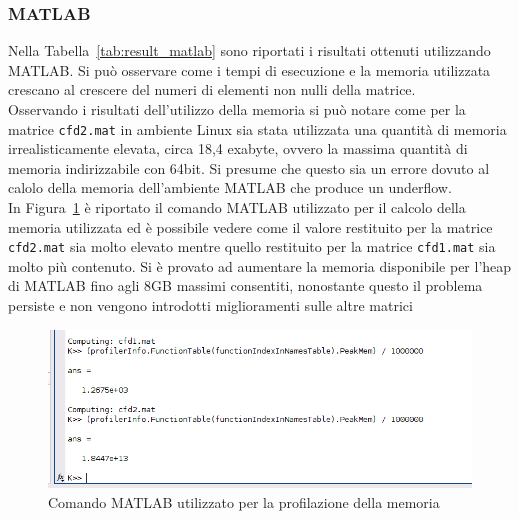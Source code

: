 \documentclass[a4paper, 12pt]{article}
\begin{document}
\subsubsection{MATLAB}
Nella Tabella~\ref{tab:result_matlab} sono riportati i risultati ottenuti
utilizzando MATLAB.
Si può osservare come i tempi di esecuzione e la memoria utilizzata crescano al
crescere del numeri di elementi non nulli della matrice.\\
Osservando i risultati dell'utilizzo della memoria si può notare come per la
matrice \texttt{cfd2.mat} in ambiente Linux sia stata utilizzata una quantità di
memoria irrealisticamente elevata, circa 18,4 exabyte, ovvero la massima
quantità di memoria indirizzabile con 64bit.
Si presume che questo sia un errore dovuto al calolo della memoria dell'ambiente
MATLAB che produce un underflow.\\
In Figura~\ref{fig:matlab_overflow} è riportato il comando MATLAB utilizzato
per il calcolo della memoria utilizzata ed è possibile vedere come il valore
restituito per la matrice \texttt{cfd2.mat} sia molto elevato mentre quello
restituito per la matrice \texttt{cfd1.mat} sia molto più contenuto.
Si è provato ad aumentare la memoria disponibile per l'heap di MATLAB fino agli
8GB massimi consentiti, nonostante questo il problema persiste e non vengono
introdotti miglioramenti sulle altre matrici
\begin{figure}[ht]
\includegraphics[width=\textwidth]{matlab_overflow}
\caption{Comando MATLAB utilizzato per la profilazione della memoria}
\label{fig:matlab_overflow}
\end{figure}\\
\end{document}
